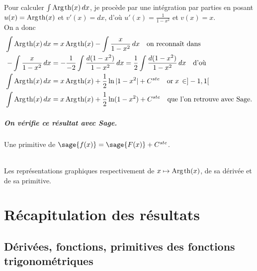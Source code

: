 \documentclass[a4paper,12pt]{report}
\renewcommand{\tanh}{\mathop{\mathrm{th}}}
\renewcommand{\arg}{\mathop{\mathrm{Arg}}}
\begin{document}
Pour calculer $\int \arg\mspace{-1mu}\tanh(x) \, dx$, je procède par une intégration par parties en posant $u(x) = \arg\mspace{-1mu}\tanh(x)$ et $v'(x) = dx$, d'où $u'(x) = \frac{1}{ 1 - x^2 }$ et $ v(x) = x $. \\
On a donc
\begin{align*}
\int \arg\mspace{-1mu}\tanh(x) \, dx & = x \arg\mspace{-1mu}\tanh(x) - \int  \frac{x}{ 1 - x^2 } \, dx \quad \textrm{on reconnaît dans}\\
- \int  \frac{x}{ 1 - x^2 } \, dx & = -\frac{1}{-2} \int  \frac{d(1 - x^2 )}{ 1 - x^2 } \, dx = \frac{1}{2} \int  \frac{d(1 - x^2 )}{ 1 - x^2 } \, dx  \quad \textrm{d'où}\\
\int \arg\mspace{-1mu}\tanh(x) \, dx & = x \arg\mspace{-1mu}\tanh(x) + \frac{1}{2} \ln|1- x^2| + C^{ste} \quad \textrm{or} \; x \, \in ]-1, 1[ \\
\int \arg\mspace{-1mu}\tanh(x) \, dx & = x \arg\mspace{-1mu}\tanh(x) + \frac{1}{2} \ln(1- x^2) + C^{ste} \quad \textrm{que l'on retrouve avec Sage.}
\end{align*}

\paragraph{On vérifie ce résultat avec Sage.}

Une primitive de $\sage{f(x)} = \sage{F(x)} + C^{ste} $.

\begin{center}
\\
Les représentations graphiques respectivement de $x \mapsto \arg\mspace{-1mu}\tanh(x)$, de sa dérivée et de sa primitive.
\end{center}


\chapter{Récapitulation des résultats}

\section{Dérivées, fonctions, primitives des fonctions trigonométriques}
\end{document}
